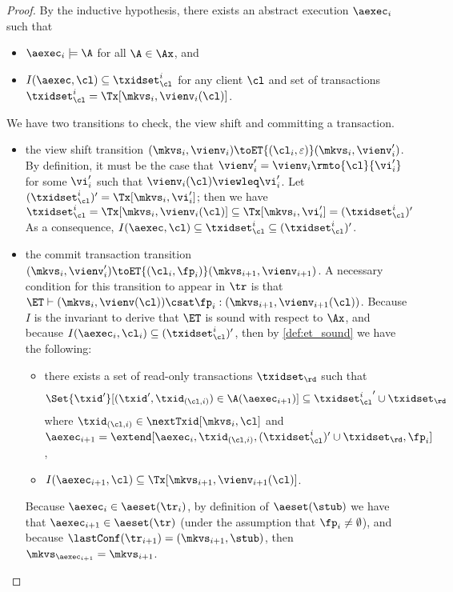 \begin{proof}
By the inductive hypothesis, there exists an abstract execution $\aexec_i$ such that  
\begin{itemize}
\item $\aexec_{i} \models \A$ for all $\A \in \Ax$, and 
\item $I(\aexec, \cl) \subseteq \txidset_{\cl}^{i}$ for any client $\cl$ and set of transactions $\txidset_{\cl}^{i} = \Tx[\mkvs_{i}, \vienv_{i}(\cl)]$.
\end{itemize}

We have two transitions to check, the view shift and committing a transaction.
\begin{itemize}
\item the view shift transition $(\mkvs_{i}, \vienv_{i}) \toET{(\cl_{i}, \varepsilon)} (\mkvs_{i}, \vienv'_{i})$. 
By definition, it must be the case that $\vienv'_{i} = \vienv_{i}\rmto{\cl}{\vi'_{i}}$ 
for some $\vi'_{i}$ such that $\vienv_{i}(\cl) \viewleq \vi'_{i}$.
Let $(\txidset_{\cl}^{i})' = \Tx[\mkvs_{i}, \vi'_{i}]$; then we have 
\(
\txidset_{\cl}^{i} = \Tx[\mkvs_{i}, \vienv_{i}(\cl)] \subseteq \Tx[\mkvs_{i}, \vi'_{i}] = (\txidset_{\cl}^{i})' \)
As a consequence, $I(\aexec, \cl) \subseteq \txidset_{\cl}^{i} \subseteq (\txidset_{\cl}^{i})'$.

\item the commit transaction transition $(\mkvs_{i}, \vienv_{i}') \toET{(\cl_{i}, \fp_{i})}
(\mkvs_{i+1}, \vienv_{i+1})$.
A necessary condition for this transition 
to appear in $\tr$ is that $\ET \vdash (\mkvs_{i}, \vienv(\cl)) \csat \fp_{i}: (\mkvs_{i+1},\vienv_{i+1}(\cl))$. 
Because $I$ is the invariant to derive that $\ET$ is sound with respect to $\Ax$, 
and because $I(\aexec_{i}, \cl_{i}) \subseteq (\txidset^{i}_{\cl})'$, 
then by \cref{def:et_sound} we have the following:
\begin{itemize}
\item there exists a set of read-only transactions $\txidset_\rd$ 
such that 
\[
    \Set{\txid' }[ (\txid', \txid_{(\cl, i)}) \in \A(\aexec_{i+1})] \subseteq {\txidset^{i}_{\cl}}' \cup \txidset_\rd
\]
where 
$\txid_{(\cl, i)} \in \nextTxid[\mkvs_{i}, \cl]$
and $\aexec_{i+1} = \extend[\aexec_{i}, \txid_{(\cl, i)}, (\txidset^{i}_{\cl})' \cup \txidset_\rd, \fp_{i}]$,
\item  $I(\aexec_{i+1}, \cl) \subseteq \Tx[\mkvs_{i+1}, \vienv_{i+1}(\cl)]$.
\end{itemize} 
Because $\aexec_{i} \in \aeset(\tr_{i})$, by definition of $\aeset(\stub)$ we have that 
$\aexec_{i+1} \in \aeset(\tr)$ (under the assumption that $\fp_{i} \neq \emptyset$), 
and because $\lastConf(\tr_{i+1}) = (\mkvs_{i+1}, \stub)$, then $\mkvs_{\aexec_{i+1}} = \mkvs_{i+1}$. 


\end{itemize}
\end{proof}
